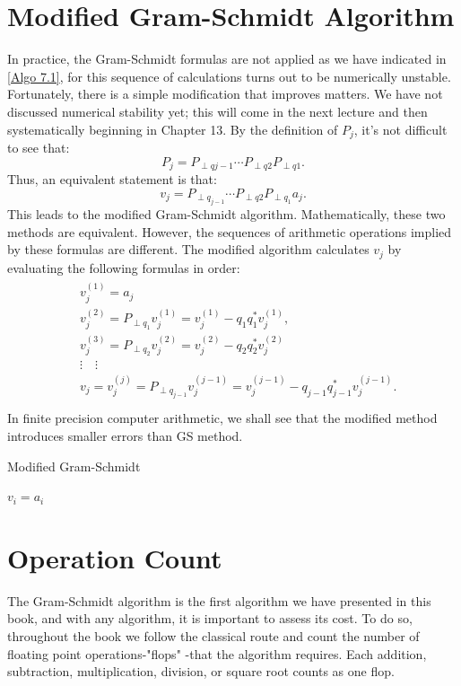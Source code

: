 \section{Modified Gram-Schmidt Algorithm}
In practice, the Gram-Schmidt formulas are not applied as we have indicated in \autoref{Algo 7.1}, for this sequence of calculations turns out to be numerically unstable. Fortunately, there is a simple modification that improves matters. We have not discussed numerical stability yet; this will come in the next lecture and then systematically beginning in Chapter 13. By the definition of $P_j$, it's not difficult to see that: 
\begin{equation}
\label{eq: decomp of project}
P_j=P_{\perp q j-1} \cdots P_{\perp q 2} P_{\perp q 1}. 
\end{equation}
Thus, an equivalent statement is that: 
\[
    v_j=P_{\perp q_{j-1}} \cdots P_{\perp q 2} P_{\perp q_1} a_j. 
\]
This leads to the modified Gram-Schmidt algorithm. 
Mathematically, these two methods are equivalent. However, the sequences of arithmetic operations implied by these formulas are different. The modified algorithm calculates $v_j$ by evaluating the following formulas in order:
\begin{align*}
\begin{aligned}
& v_j^{(1)}=a_j \\
& v_j^{(2)}=P_{\perp q_1} v_j^{(1)}=v_j^{(1)}-q_1 q_1^* v_j^{(1)}, \\
& v_j^{(3)}=P_{\perp q_2} v_j^{(2)}=v_j^{(2)}-q_2 q_2^* v_j^{(2)} \\
& \vdots \quad \vdots \\
& v_j=v_j^{(j)}=P_{\perp q_{j-1}} v_j^{(j-1)}=v_j^{(j-1)}-q_{j-1} q_{j-1}^* v_j^{(j-1)} . \\
&
\end{aligned}
\end{align*}
In finite precision computer arithmetic, we shall see that the modified method introduces smaller errors than GS method. 

\begin{algorithm}[H]
    \caption{Modified Gram-Schmidt}
    \label{Algo 8.1}
     { 
        $ v_i=a_i $\;  
     } 
\end{algorithm}

\section{Operation Count}
The Gram-Schmidt algorithm is the first algorithm we have presented in this book, and with any algorithm, it is important to assess its cost. To do so, throughout the book we follow the classical route and count the number of floating point operations-"flops" -that the algorithm requires. Each addition, subtraction, multiplication, division, or square root counts as one flop. 


